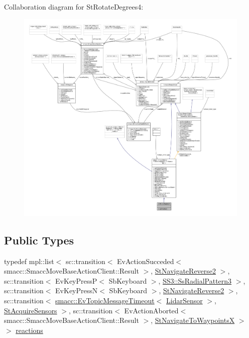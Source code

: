 Collaboration diagram for St\+Rotate\+Degrees4\+:
\nopagebreak
\begin{figure}[H]
\begin{center}
\leavevmode
\includegraphics[width=350pt]{structStRotateDegrees4__coll__graph}
\end{center}
\end{figure}
\subsection*{Public Types}
\begin{DoxyCompactItemize}
\item 
typedef mpl\+::list$<$ sc\+::transition$<$ Ev\+Action\+Succeded$<$ smacc\+::\+Smacc\+Move\+Base\+Action\+Client\+::\+Result $>$, \hyperlink{structStNavigateReverse2}{St\+Navigate\+Reverse2} $>$, sc\+::transition$<$ Ev\+Key\+PressP$<$ Sb\+Keyboard $>$, \hyperlink{structSS3_1_1SsRadialPattern3}{S\+S3\+::\+Ss\+Radial\+Pattern3} $>$, sc\+::transition$<$ Ev\+Key\+PressN$<$ Sb\+Keyboard $>$, \hyperlink{structStNavigateReverse2}{St\+Navigate\+Reverse2} $>$, sc\+::transition$<$ \hyperlink{structsmacc_1_1EvTopicMessageTimeout}{smacc\+::\+Ev\+Topic\+Message\+Timeout}$<$ \hyperlink{sensor__state_8h_a9db9e1944f88de79507758d08e4a2ee3}{Lidar\+Sensor} $>$, \hyperlink{structStAcquireSensors}{St\+Acquire\+Sensors} $>$, sc\+::transition$<$ Ev\+Action\+Aborted$<$ smacc\+::\+Smacc\+Move\+Base\+Action\+Client\+::\+Result $>$, \hyperlink{structStNavigateToWaypointsX}{St\+Navigate\+To\+WaypointsX} $>$ $>$ \hyperlink{structStRotateDegrees4_afd68a8061d932ed3aa2e332700f3c430}{reactions}
\end{DoxyCompactItemize}
